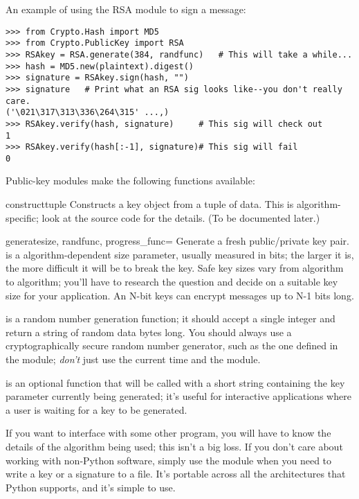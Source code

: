 \documentclass{howto}
\begin{document}
An example of using the RSA module to sign a message:
\begin{verbatim}
>>> from Crypto.Hash import MD5
>>> from Crypto.PublicKey import RSA
>>> RSAkey = RSA.generate(384, randfunc)   # This will take a while...
>>> hash = MD5.new(plaintext).digest()
>>> signature = RSAkey.sign(hash, "")
>>> signature   # Print what an RSA sig looks like--you don't really care.
('\021\317\313\336\264\315' ...,)
>>> RSAkey.verify(hash, signature)     # This sig will check out
1
>>> RSAkey.verify(hash[:-1], signature)# This sig will fail
0
\end{verbatim}

Public-key modules make the following functions available:

\begin{funcdesc}{construct}{tuple}
Constructs a key object from a tuple of data.  This is
algorithm-specific; look at the source code for the details.  (To be
documented later.)
\end{funcdesc}

\begin{funcdesc}{generate}{size, randfunc, progress_func=}
Generate a fresh public/private key pair.   is a
algorithm-dependent size parameter, usually measured in bits; the
larger it is, the more difficult it will be to break the key.  Safe
key sizes vary from algorithm to algorithm; you'll have to research
the question and decide on a suitable key size for your application.
An N-bit keys can encrypt messages up to N-1 bits long.

 is a random number generation function; it should
accept a single integer  and return a string of random data
 bytes long.  You should always use a cryptographically secure
random number generator, such as the one defined in the
 module; \emph{don't} just use the
current time and the  module. 

 is an optional function that will be called with a short
string containing the key parameter currently being generated; it's
useful for interactive applications where a user is waiting for a key
to be generated.
\end{funcdesc}

If you want to interface with some other program, you will have to know
the details of the algorithm being used; this isn't a big loss.  If you
don't care about working with non-Python software, simply use the
 module when you need to write a key or a signature to a
file.  It's portable across all the architectures that Python supports,
and it's simple to use.
\end{document}
